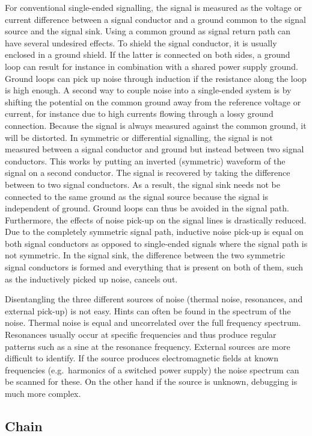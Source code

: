 For conventional single-ended signalling, the signal is measured as the voltage or current difference between a signal conductor and a ground common to the signal source and the signal sink.
Using a common ground as signal return path can have several undesired effects.
To shield the signal conductor, it is usually enclosed in a ground shield.
If the latter is connected on both sides, a ground loop can result for instance in combination with a shared power supply ground.
Ground loops can pick up noise through induction if the resistance along the loop is high enough.
A second way to couple noise into a single-ended system is by shifting the potential on the common ground away from the reference voltage or current, for instance due to high currents flowing through a lossy ground connection.
Because the signal is always measured against the common ground, it will be distorted.
In symmetric or differential signalling, the signal is not measured between a signal conductor and ground but instead between two signal conductors.
This works by putting an inverted (symmetric) waveform of the signal on a second conductor.
The signal is recovered by taking the difference between to two signal conductors.
As a result, the signal sink needs not be connected to the same ground as the signal source because the signal is independent of ground.
Ground loops can thus be avoided in the signal path.
Furthermore, the effects of noise pick-up on the signal lines is drastically reduced.
Due to the completely symmetric signal path, inductive noise pick-up is equal on both signal conductors as opposed to single-ended signals where the signal path is not symmetric.
In the signal sink, the difference between the two symmetric signal conductors is formed and everything that is present on both of them, such as the inductively picked up noise, cancels out.

Disentangling the three different sources of noise (thermal noise, resonances, and external pick-up) is not easy.
Hints can often be found in the spectrum of the noise.
Thermal noise is equal and uncorrelated over the full frequency spectrum.
Resonances usually occur at specific frequencies and thus produce regular patterns such as a sine at the resonance frequency.
External sources are more difficult to identify.
If the source produces electromagnetic fields at known frequencies (e.g.\ harmonics of a switched power supply) the noise spectrum can be scanned for these.
On the other hand if the source is unknown, debugging is much more complex.


\subsection{\AT{} Chain}
\label{sec:studies_electronics_at}

